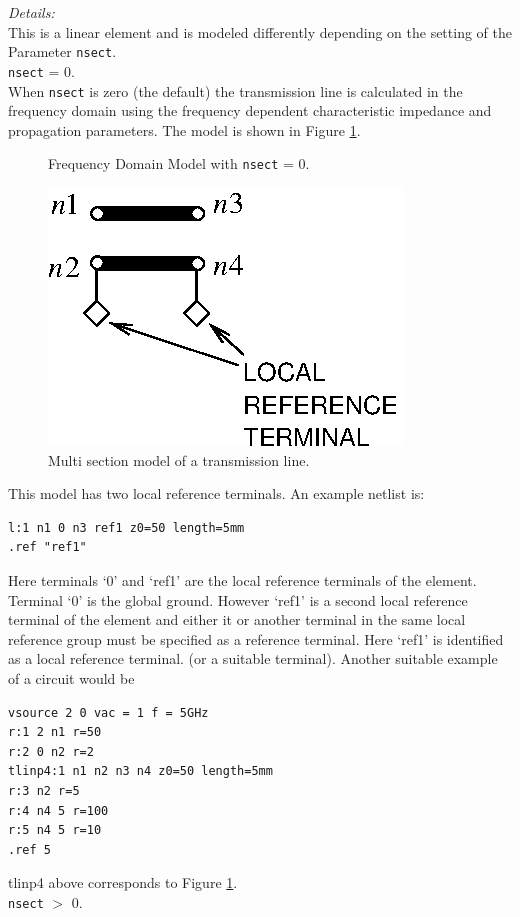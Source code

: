 \documentclass{article}
\begin{document}
{\textit{Details:}\\
This is a linear element and is modeled differently depending on the setting of the Parameter \texttt{nsect}.\\[0.2in]
\texttt{nsect} = 0.\\[0.1in]
 When  \texttt{nsect} is zero (the default) the transmission line is calculated in the frequency domain using the frequency dependent characteristic impedance and propagation parameters.  The model is shown in Figure \ref{tlinp4:multi:model}.
\begin{figure}[h]
\centerline{Frequency Domain Model with \texttt{nsect} = 0.}
\centerline{\includegraphics[scale=1.0]{tlinp4_multi.eps}}
\caption{\label{tlinp4:multi:model}Multi section model of a transmission line.}
\end{figure}
%
This model has two local reference terminals. An example netlist is:
\begin{verbatim}
l:1 n1 0 n3 ref1 z0=50 length=5mm
.ref "ref1"
\end{verbatim}
Here terminals `0' and `ref1' are the local reference terminals of the element. Terminal `0' is the global ground.  However `ref1' is a second local reference terminal of the element and either it or another terminal in the same local reference group must be specified as a reference terminal.  Here `ref1' is identified as a local reference terminal. (or a suitable terminal).  Another suitable example of a circuit would be
\begin{verbatim}
vsource 2 0 vac = 1 f = 5GHz
r:1 2 n1 r=50
r:2 0 n2 r=2
tlinp4:1 n1 n2 n3 n4 z0=50 length=5mm
r:3 n2 r=5
r:4 n4 5 r=100
r:5 n4 5 r=10
.ref 5
\end{verbatim}
tlinp4 above corresponds to Figure \ref{tlinp4:multi:model}. \\[0.2in]
\texttt{nsect} $>$ 0.\\[0.1in]
}
\end{document}

